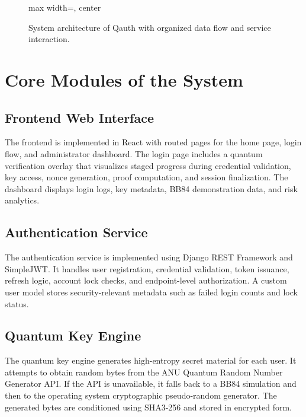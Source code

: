 \documentclass[12pt,a4paper]{report}
\begin{document}
\begin{figure}[H]
\begin{adjustbox}{max width=\textwidth, center}
\end{adjustbox}
\caption{System architecture of Qauth with organized data flow and service interaction.}
\label{fig:qauth-architecture}
\end{figure}

\section{Core Modules of the System}

\subsection{Frontend Web Interface}
The frontend is implemented in React with routed pages for the home page, login flow, and administrator dashboard. The login page includes a quantum verification overlay that visualizes staged progress during credential validation, key access, nonce generation, proof computation, and session finalization. The dashboard displays login logs, key metadata, BB84 demonstration data, and risk analytics.

\subsection{Authentication Service}
The authentication service is implemented using Django REST Framework and SimpleJWT. It handles user registration, credential validation, token issuance, refresh logic, account lock checks, and endpoint-level authorization. A custom user model stores security-relevant metadata such as failed login counts and lock status.

\subsection{Quantum Key Engine}
The quantum key engine generates high-entropy secret material for each user. It attempts to obtain random bytes from the ANU Quantum Random Number Generator API. If the API is unavailable, it falls back to a BB84 simulation and then to the operating system cryptographic pseudo-random generator. The generated bytes are conditioned using SHA3-256 and stored in encrypted form.
\end{document}
